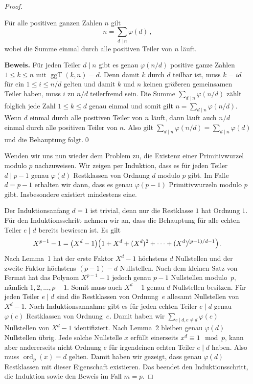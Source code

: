 \begin{proof}
	\begin{satzmitnamen}[Lemma~2]
		Für alle positiven ganzen Zahlen $n$ gilt
		\begin{equation*}
			n=\sum_{d\mid n}\varphi(d)\,,
		\end{equation*}
		wobei die Summe einmal durch alle positiven Teiler von $n$ läuft.
	\end{satzmitnamen}
	\textbf{Beweis.} Für jeden Teiler $d\mid n$ gibt es genau $\varphi(n/d)$ positive ganze Zahlen $1\leqslant k\leqslant n$ mit $\operatorname{ggT}(k,n)=d$. Denn damit $k$ durch $d$ teilbar ist, muss $k=id$ für ein $1\leqslant i\leqslant n/d$ gelten und damit $k$ und $n$ keinen größeren gemeinsamen Teiler haben, muss $i$ zu $n/d$ teilerfremd sein. Die Summe $\sum_{d\mid n}\varphi(n/d)$ zählt folglich jede Zahl $1\leqslant k\leqslant d$ genau einmal und somit gilt $n=\sum_{d\mid n}\varphi(n/d)$. Wenn $d$ einmal durch alle positiven Teiler von $n$ läuft, dann läuft auch $n/d$ einmal durch alle positiven Teiler von $n$. Also gilt $\sum_{d\mid n}\varphi(n/d)=\sum_{d\mid n}\varphi(d)$ und die Behauptung folgt.\qed
	
	Wenden wir uns nun wieder dem Problem zu, die Existenz einer Primitivwurzel modulo $p$ nachzuweisen. Wir zeigen per Induktion, dass es für jeden Teiler $d\mid p-1$ genau $\varphi(d)$ Restklassen von Ordnung $d$ modulo $p$ gibt. Im Falle $d=p-1$ erhalten wir dann, dass es genau $\varphi(p-1)$ Primitivwurzeln modulo $p$ gibt. Insbesondere existiert mindestens eine.
	
	Der Induktionsanfang $d=1$ ist trivial, denn nur die Restklasse $1$ hat Ordnung $1$. Für den Induktionsschritt nehmen wir an, dass die Behauptung für alle echten Teiler $e\mid d$ bereits bewiesen ist. Es gilt
	\begin{equation*}
		X^{p-1}-1= \parens*{X^d-1}\parens*{1+X^d+(X^d)^2+\dotsb+(X^d)^{(p-1)/d-1}}\,.
	\end{equation*}
	Nach Lemma~1 hat der erste Faktor $X^d-1$ höchstens $d$ Nullstellen und der zweite Faktor höchstens $(p-1)-d$ Nullstellen. Nach dem kleinen Satz von Fermat hat das Polynom $X^{p-1}-1$ jedoch genau $p-1$ Nullstellen modulo~$p$, nämlich $1,2,\dotsc,p-1$. Somit muss auch $X^d-1$ genau $d$ Nullstellen besitzen. Für jeden Teiler $e\mid d$ sind die Restklassen von Ordnung~$e$ allesamt Nullstellen von $X^d-1$. Nach Induktionsannahme gibt es für jeden echten Teiler $e\mid d$ genau $\varphi(e)$ Restklassen von Ordnung~$e$. Damit haben wir $\sum_{e\mid d,e\neq d}\varphi(e)$ Nullstellen von $X^d-1$ identifiziert. Nach Lemma~2 bleiben genau $\varphi(d)$ Nullstellen übrig. Jede solche Nullstelle $x$ erfüllt einerseits $x^d\equiv 1\mod p$, kann aber andererseits nicht Ordnung $e$ für irgendeinen echten Teiler $e\mid d$ haben. Also muss $\operatorname{ord}_p(x)=d$ gelten. Damit haben wir gezeigt, dass genau $\varphi(d)$ Restklassen mit dieser Eigenschaft existieren. Das beendet den Induktionsschritt, die Induktion sowie den Beweis im Fall $m=p$.
	

\end{proof}
